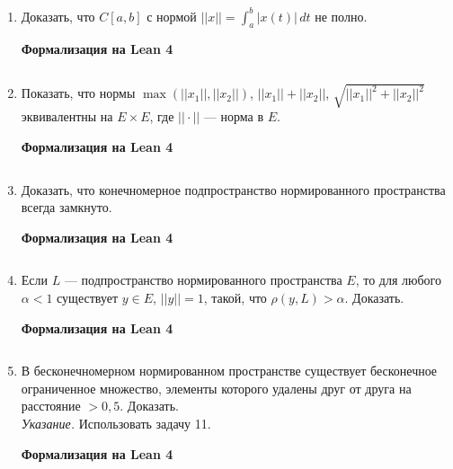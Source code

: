 \documentclass[12pt,a4paper]{article}
\begin{document}
\begin{enumerate}
\begin{center}\small\textbf{Формализация на Lean 4}\end{center}
\inputminted{lean}{FunAn/Section11_NormedSpaces/Task07.lean}

\newpage
\item Доказать, что $C[a,b]$ с нормой $||x||=\int_{a}^{b}|x(t)| \, dt$ не полно.

\begin{center}\small\textbf{Формализация на Lean 4}\end{center}
\inputminted{lean}{FunAn/Section11_NormedSpaces/Task08.lean}

\newpage
\item Показать, что нормы $\max(||x_{1}||,||x_{2}||)$, $||x_{1}||+||x_{2}||$, $\sqrt{||x_{1}||^{2}+||x_{2}||^{2}}$ эквивалентны на $E\times E$, где $|| \cdot ||$ — норма в $E$.

\begin{center}\small\textbf{Формализация на Lean 4}\end{center}
\inputminted{lean}{FunAn/Section11_NormedSpaces/Task09.lean}

\newpage
\item Доказать, что конечномерное подпространство нормированного пространства всегда замкнуто.

\begin{center}\small\textbf{Формализация на Lean 4}\end{center}
\inputminted{lean}{FunAn/Section11_NormedSpaces/Task10.lean}

\newpage
\item Если $L$ — подпространство нормированного пространства $E$, то для любого $\alpha<1$ существует $y\in E$, $||y||=1$, такой, что $\rho(y,L)>\alpha$. Доказать.

\begin{center}\small\textbf{Формализация на Lean 4}\end{center}
\inputminted{lean}{FunAn/Section11_NormedSpaces/Task11.lean}

\newpage
\item В бесконечномерном нормированном пространстве существует бесконечное ограниченное множество, элементы которого удалены друг от друга на расстояние $>0,5$. Доказать.\\
\textit{Указание.} Использовать задачу 11.

\begin{center}\small\textbf{Формализация на Lean 4}\end{center}
\inputminted{lean}{FunAn/Section11_NormedSpaces/Task12.lean}


\end{enumerate}
\end{document}

